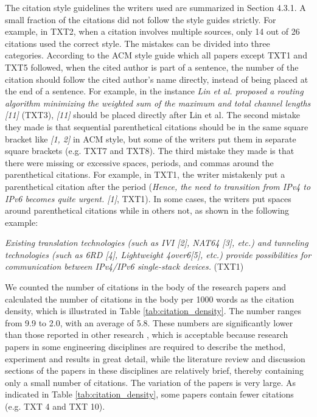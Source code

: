 The citation style guidelines the writers used are summarized in Section 4.3.1. A small fraction of the citations did not follow the style guides strictly. For example, in TXT2, when a citation involves multiple sources, only 14 out of 26 citations used the correct style. The mistakes can be divided into three categories. According to the ACM style guide which all papers except TXT1 and TXT5 followed, when the cited author is part of a sentence, the number of the citation should follow the cited author’s name directly, instead of being placed at the end of a sentence. For example, in the instance \textit{Lin et al. proposed a routing algorithm minimizing the weighted sum of the maximum and total channel lengths [11]} (TXT3), \textit{[11]} should be placed directly after Lin et al. The second mistake they made is that sequential parenthetical citations should be in the same square bracket like \textit{[1, 2]} in ACM style, but some of the writers put them in separate square brackets (e.g. TXT7 and TXT8). The third mistake they made is that there were missing or excessive spaces, periods, and commas around the parenthetical citations. For example, in TXT1, the writer mistakenly put a parenthetical citation after the period (\textit{Hence, the need to transition from IPv4 to IPv6 becomes quite urgent. [1]}, TXT1). In some cases, the writers put spaces around parenthetical citations while in others not, as shown in the following example:

\textit{Existing translation technologies (such as IVI [2], NAT64 [3], etc.) and tunneling technologies (such as 6RD [4], Lightweight 4over6[5], etc.) provide possibilities for communication between IPv4/IPv6 single-stack devices.} (TXT1)

We counted the number of citations in the body of the research papers and calculated the number of citations in the body per 1000 words as the citation density, which is illustrated in Table \ref{tab:citation_density}. The number ranges from 9.9 to 2.0, with an average of 5.8. These numbers are significantly lower than those reported in other research \citep{fazel_citation_2015,samraj_form_2013,wette_source_2017}, which is acceptable because research papers in some engineering disciplines are required to describe the method, experiment and results in great detail, while the literature review and discussion sections of the papers in these disciplines are relatively brief, thereby containing only a small number of citations. The variation of the papers is very large. As indicated in Table \ref{tab:citation_density}, some papers contain fewer citations (e.g. TXT 4 and TXT 10).

